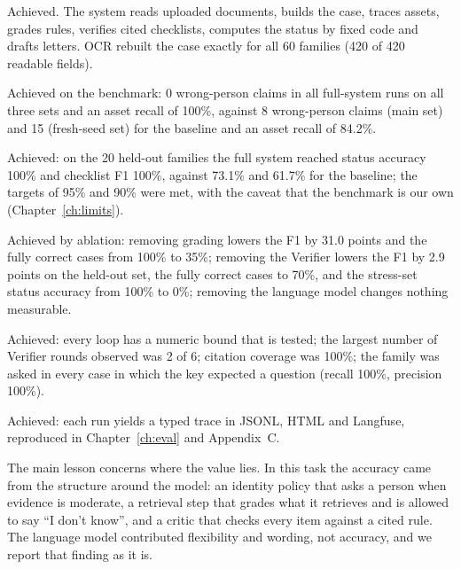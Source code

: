 \documentclass[12pt,a4paper,oneside]{report}
\begin{document}
\begin{description}[leftmargin=1.4cm,labelwidth=1.1cm,itemsep=3pt]
\item[O1 (end-to-end workflow)] Achieved. The system reads uploaded documents, builds the case, traces assets, grades rules, verifies cited checklists, computes the status by fixed code and drafts letters. OCR rebuilt the case exactly for all 60 families (420 of 420 readable fields).
\item[O2 (safety of identity and recall)] Achieved on the benchmark: 0 wrong-person claims in all full-system runs on all three sets and an asset recall of 100\%, against 8 wrong-person claims (main set) and 15 (fresh-seed set) for the baseline and an asset recall of 84.2\%.
\item[O3 (accuracy against a baseline)] Achieved: on the 20 held-out families the full system reached status accuracy 100\% and checklist F1 100\%, against 73.1\% and 61.7\% for the baseline; the targets of 95\% and 90\% were met, with the caveat that the benchmark is our own (Chapter~\ref{ch:limits}).
\item[O4 (contribution of components)] Achieved by ablation: removing grading lowers the F1 by 31.0 points and the fully correct cases from 100\% to 35\%; removing the Verifier lowers the F1 by 2.9 points on the held-out set, the fully correct cases to 70\%, and the stress-set status accuracy from 100\% to 0\%; removing the language model changes nothing measurable.
\item[O5 (bounded and cited)] Achieved: every loop has a numeric bound that is tested; the largest number of Verifier rounds observed was 2 of 6; citation coverage was 100\%; the family was asked in every case in which the key expected a question (recall 100\%, precision 100\%).
\item[O6 (observability)] Achieved: each run yields a typed trace in JSONL, HTML and Langfuse, reproduced in Chapter~\ref{ch:eval} and Appendix~C.
\end{description}

The main lesson concerns where the value lies. In this task the accuracy came from the structure around the model: an identity policy that asks a person when evidence is moderate, a retrieval step that grades what it retrieves and is allowed to say ``I don't know'', and a critic that checks every item against a cited rule. The language model contributed flexibility and wording, not accuracy, and we report that finding as it is.
\end{document}
